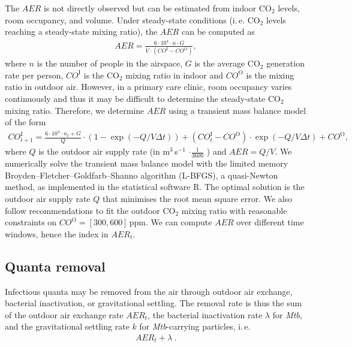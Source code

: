 \documentclass[fleqn,11pt]{wlscirep_supp}
\newcommand\ie{i.\,e.\xspace}
\begin{document}
The $AER$ is not directly observed but can be estimated from indoor CO$_2$ levels, room occupancy, and volume. Under steady-state conditions (\ie CO$_2$ levels reaching a steady-state mixing ratio), the $AER$ can be computed as
\begin{align}
    AER = \frac{6\cdot10^4 \cdot n \cdot G}{V\cdot(CO^{\text{I}}-CO^{\text{O}})},
\end{align}
where $n$ is the number of people in the airspace, $G$ is the average CO$_2$ generation rate per person, $CO^{\text{I}}$ is the CO$_2$ mixing ratio in indoor and $CO^{\text{O}}$ is the mixing ratio in outdoor air\cite{Batterman2017IJERPH}. However, in a primary care clinic, room occupancy varies continuously and thus it may be difficult to determine the steady-state CO$_2$ mixing ratio. Therefore, we determine $AER$ using a transient mass balance model of the form\cite{Batterman2017IJERPH}
\begin{align}
    CO_{t+1}^{\text{I}} = \frac{6\cdot10^4 \cdot n_t + G}{Q} \cdot \left(1 - \exp(-Q/V \Delta t)\right) + (CO_t^{\text{I}}-CO^{\text{O}}) \cdot \exp(-Q/V \Delta t) + CO^{\text{O}},
\end{align}
where $Q$ is the outdoor air supply rate (in m$^3$\,s$^{-1}$ $\cdot \frac{1}{3600}$ ) and $AER = Q/V$. We numerically solve the transient mass balance model with the limited memory Broyden–Fletcher–Goldfarb–Shanno algorithm (L-BFGS), a quasi-Newton method, as implemented in the statistical software R\cite{Byrd1995SIAM}. The optimal solution is the outdoor air supply rate $Q$ that minimises the root mean square error. We also follow recommendations to fit the outdoor CO$_2$ mixing ratio with reasonable constraints on $CO^{\text{O}} = [300,600]$\,ppm\cite{Batterman2017IJERPH}. We can compute $AER$ over different time windows, hence the index in $AER_t$.

\subsection{Quanta removal}\label{sec:quanta-removal}

Infectious quanta may be removed from the air through outdoor air exchange, bacterial inactivation, or gravitational settling. The removal rate is thus the sum of the outdoor air exchange rate $AER_t$, the bacterial inactivation rate $\lambda$ for \emph{Mtb}, and the gravitational settling rate $k$ for \emph{Mtb}-carrying particles, \ie 
\begin{align}\label{eq:removal}
    AER_t + \lambda ~.
\end{align}
\end{document}
